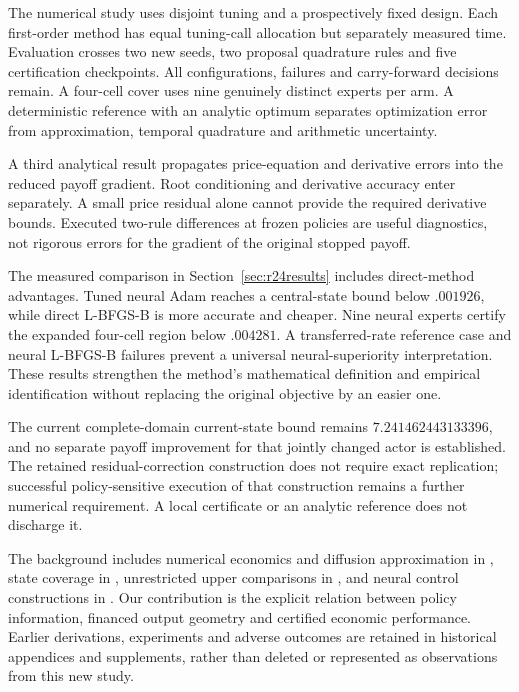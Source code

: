 The numerical study uses disjoint tuning and a prospectively fixed design. Each first-order method has equal tuning-call allocation but separately measured time. Evaluation crosses two new seeds, two proposal quadrature rules and five certification checkpoints. All configurations, failures and carry-forward decisions remain. A four-cell cover uses nine genuinely distinct experts per arm. A deterministic reference with an analytic optimum separates optimization error from approximation, temporal quadrature and arithmetic uncertainty.

A third analytical result propagates price-equation and derivative errors into the reduced payoff gradient. Root conditioning and derivative accuracy enter separately. A small price residual alone cannot provide the required derivative bounds. Executed two-rule differences at frozen policies are useful diagnostics, not rigorous errors for the gradient of the original stopped payoff.

The measured comparison in Section~\ref{sec:r24results} includes direct-method advantages. Tuned neural Adam reaches a central-state bound below $.001926$, while direct L-BFGS-B is more accurate and cheaper. Nine neural experts certify the expanded four-cell region below $.004281$. A transferred-rate reference case and neural L-BFGS-B failures prevent a universal neural-superiority interpretation. These results strengthen the method's mathematical definition and empirical identification without replacing the original objective by an easier one.

The current complete-domain current-state bound remains $7.241462443133396$, and no separate payoff improvement for that jointly changed actor is established. The retained residual-correction construction does not require exact replication; successful policy-sensitive execution of that construction remains a further numerical requirement. A local certificate or an analytic reference does not discharge it.

The background includes numerical economics and diffusion approximation in \citet{Judd1998,KushnerDupuis2001,BarlesSouganidis1991}, state coverage in \citet{BrummScheidegger2017}, unrestricted upper comparisons in \citet{BrownSmithSun2010,BrownSmith2011}, and neural control constructions in \citet{HanE2016,HanJentzenE2018}. Our contribution is the explicit relation between policy information, financed output geometry and certified economic performance. Earlier derivations, experiments and adverse outcomes are retained in historical appendices and supplements, rather than deleted or represented as observations from this new study.
